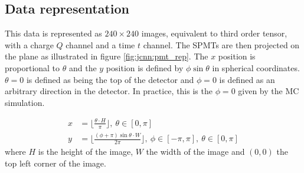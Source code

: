 \subsection{Data representation}
\label{sec:jcnn:data}

This data is represented as $240 \times 240$ images, equivalent to third order tensor, with a charge $Q$ channel and a time $t$ channel. The SPMTs are then projected on the plane as illustrated in figure \ref{fig:jcnn:pmt_rep}. The $x$ position is proportional to $\theta$ and the $y$ position is defined by $\phi \sin{\theta}$ in spherical coordinates. $\theta = 0$ is defined as being the top of the detector and $\phi = 0$ is defined as an arbitrary direction in the detector. In practice, this is the $\phi = 0$ given by the MC simulation.

\begin{align}
  x &= \bigg\lfloor \frac{\theta \cdot H}{\pi} \bigg\rfloor, ~ \theta \in [0, \pi] \\
  y &= \bigg\lfloor \frac{(\phi + \pi) \sin{\theta} \cdot W}{2\pi}\bigg\rfloor, ~ \phi \in [-\pi, \pi], ~ \theta \in [0, \pi]
\end{align}
where $H$ is the height of the image, $W$ the width of the image and $(0,0)$ the top left corner of the image.

